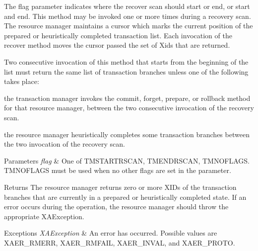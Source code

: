 The flag parameter indicates where the recover scan should start or end, or start and end. This method may be invoked one or more times during a recovery scan. The resource manager maintains a cursor which marks the current position of the prepared or heuristically completed transaction list. Each invocation of the recover method moves the cursor passed the set of Xids that are returned.

Two consecutive invocation of this method that starts from the beginning of the list must return the same list of transaction branches unless one of the following takes place\+:


\begin{DoxyItemize}
\item the transaction manager invokes the commit, forget, prepare, or rollback method for that resource manager, between the two consecutive invocation of the recovery scan.
\item the resource manager heuristically completes some transaction branches between the two invocation of the recovery scan.
\end{DoxyItemize}


\begin{DoxyParams}{Parameters}
{\em flag} & One of T\+M\+S\+T\+A\+R\+T\+R\+S\+C\+AN, T\+M\+E\+N\+D\+R\+S\+C\+AN, T\+M\+N\+O\+F\+L\+A\+GS. T\+M\+N\+O\+F\+L\+A\+GS must be used when no other flags are set in the parameter.\\
\hline
\end{DoxyParams}
\begin{DoxyReturn}{Returns}
The resource manager returns zero or more X\+I\+Ds of the transaction branches that are currently in a prepared or heuristically completed state. If an error occurs during the operation, the resource manager should throw the appropriate X\+A\+Exception.
\end{DoxyReturn}

\begin{DoxyExceptions}{Exceptions}
{\em X\+A\+Exception} & An error has occurred. Possible values are X\+A\+E\+R\+\_\+\+R\+M\+E\+RR, X\+A\+E\+R\+\_\+\+R\+M\+F\+A\+IL, X\+A\+E\+R\+\_\+\+I\+N\+V\+AL, and X\+A\+E\+R\+\_\+\+P\+R\+O\+TO. \\
\hline
\end{DoxyExceptions}
\mbox{\label{classcom_1_1mysql_1_1jdbc_1_1jdbc2_1_1optional_1_1_mysql_x_a_connection_ae3f99ed779f888fbf58e1c447862a962}} 
